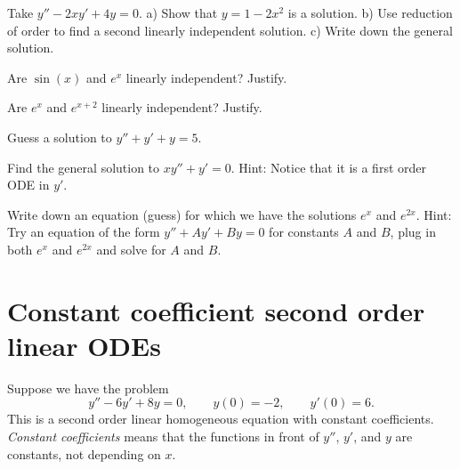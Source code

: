 \begin{exercise}
Take 
$y''-2xy' + 4y = 0$.  a) Show that $y=1-2x^2$ is a solution.  
b) Use reduction of order to find a second linearly independent solution.
c) Write down the general solution.
\end{exercise}

\setcounter{exercise}{100}

\begin{exercise}
Are $\sin(x)$ and $e^x$ linearly independent?  Justify.
\end{exercise}

\begin{exercise}
Are $e^x$ and $e^{x+2}$ linearly independent?  Justify.
\end{exercise}

\begin{exercise}
Guess a solution to $y'' + y' + y= 5$.
\end{exercise}

\begin{exercise}
Find the general solution to
$x y'' + y' = 0$.  Hint: Notice that it is a first order ODE in $y'$.
\end{exercise}

\begin{exercise}
Write down an equation (guess) for which we have the solutions
$e^x$ and $e^{2x}$.  Hint: Try an equation of the form
$y''+Ay'+By = 0$ for constants $A$ and $B$,
plug in both $e^x$ and $e^{2x}$ and solve for $A$ and $B$.
\end{exercise}



\sectionnewpage
\section{Constant coefficient second order linear ODEs}
\label{sec:ccsol}


Suppose we have the problem
\begin{equation*}
y''-6y'+8y = 0, \qquad y(0) = - 2, \qquad y'(0) = 6 .
\end{equation*}
This is a second order linear homogeneous equation with constant
coefficients.  \emph{Constant coefficients}
means that the functions 
in front of $y''$, $y'$, and $y$ are constants, not depending on $x$.

